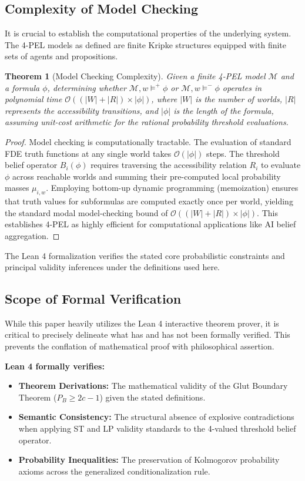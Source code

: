 \documentclass[11pt,a4paper]{article}
\newtheorem{theorem}{Theorem}[section]
\begin{document}
\subsection{Complexity of Model Checking}
It is crucial to establish the computational properties of the underlying system. The 4-PEL models as defined are finite Kripke structures equipped with finite sets of agents and propositions. 
\begin{theorem}[Model Checking Complexity]
Given a finite 4-PEL model $\mathcal{M}$ and a formula $\phi$, determining whether $\mathcal{M}, w \models^+ \phi$ or $\mathcal{M}, w \models^- \phi$ operates in polynomial time $\mathcal{O}((|W| + |R|) \times |\phi|)$, where $|W|$ is the number of worlds, $|R|$ represents the accessibility transitions, and $|\phi|$ is the length of the formula, assuming unit-cost arithmetic for the rational probability threshold evaluations.
\end{theorem}
\begin{proof}
Model checking is computationally tractable. The evaluation of standard FDE truth functions at any single world takes $\mathcal{O}(|\phi|)$ steps. The threshold belief operator $B_i(\phi)$ requires traversing the accessibility relation $R_i$ to evaluate $\phi$ across reachable worlds and summing their pre-computed local probability masses $\mu_{i,w}$. Employing bottom-up dynamic programming (memoization) ensures that truth values for subformulas are computed exactly once per world, yielding the standard modal model-checking bound of $\mathcal{O}((|W| + |R|) \times |\phi|)$. This establishes 4-PEL as highly efficient for computational applications like AI belief aggregation.
\end{proof}

The Lean 4 formalization verifies the stated core probabilistic constraints and principal validity inferences under the definitions used here.

\subsection{Scope of Formal Verification}

While this paper heavily utilizes the Lean 4 interactive theorem prover, it is critical to precisely delineate what has and has not been formally verified. This prevents the conflation of mathematical proof with philosophical assertion.

\textbf{Lean 4 formally verifies:}
\begin{itemize}
    \item \textbf{Theorem Derivations:} The mathematical validity of the Glut Boundary Theorem ($P_B \ge 2c - 1$) given the stated definitions.
    \item \textbf{Semantic Consistency:} The structural absence of explosive contradictions when applying ST and LP validity standards to the 4-valued threshold belief operator.
    \item \textbf{Probability Inequalities:} The preservation of Kolmogorov probability axioms across the generalized conditionalization rule.
\end{itemize}
\end{document}
